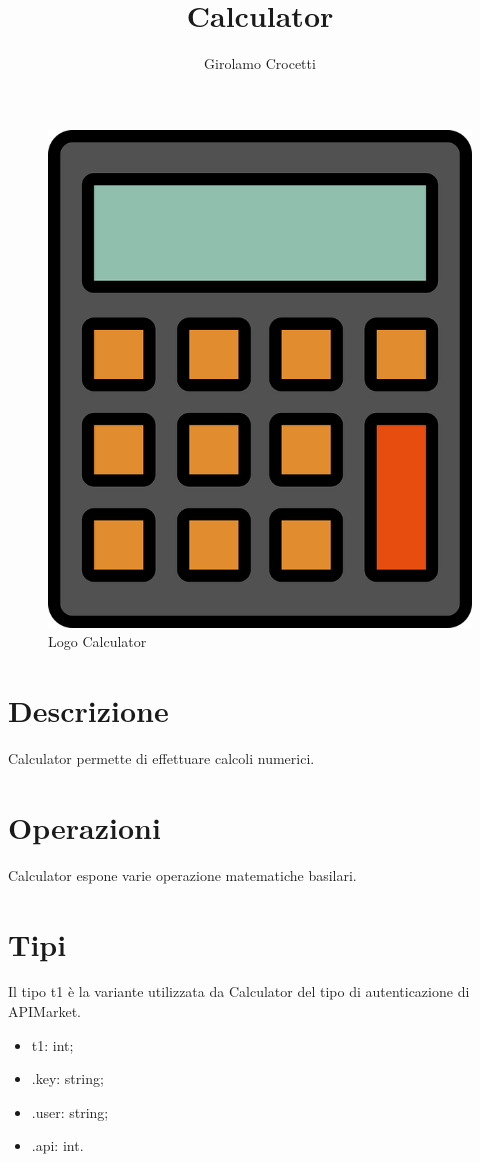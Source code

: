 \documentclass[a4paper]{article}
\title{Calculator}
\author{Girolamo Crocetti}
\begin{document}
\maketitle

\begin{figure}[H]
	\centering
	\includegraphics[width=0.3\linewidth]{Calculator.png}
	\caption{Logo Calculator}
\end{figure}

\section{Descrizione}

Calculator permette di effettuare calcoli numerici.

\section{Operazioni}

Calculator espone varie operazione matematiche basilari.

\section{Tipi}

Il tipo t1 è la variante utilizzata da Calculator del tipo di autenticazione di APIMarket.
\begin{itemize}
	\item t1: int;
	\item .key: string;
	\item .user: string;
	\item .api: int.
\end{itemize}
\end{document}
